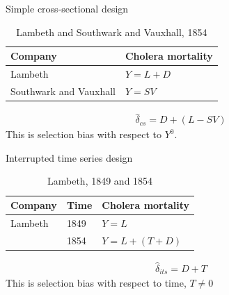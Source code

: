 \documentclass{beamer}
\begin{document}
\begin{frame}{Simple cross-sectional design}

\begin{table}\centering
		\caption{Lambeth and Southwark and Vauxhall, 1854}
		\begin{center}
		\begin{tabular}{ll}
		\toprule
		\multicolumn{1}{l}{\textbf{Company}}&
		\multicolumn{1}{c}{\textbf{Cholera mortality}}\\
		\midrule
		Lambeth  & $Y=L + D$ \\
		\midrule
		Southwark and Vauxhall  & $Y=SV$ \\
		\bottomrule
		\end{tabular}
		\end{center}
	\end{table}

\bigskip

\begin{eqnarray*}
\widehat{\delta}_{cs} = D + (L-SV)
\end{eqnarray*}This is selection bias with respect to $Y^0$.

\end{frame}

\begin{frame}{Interrupted time series design}

	\begin{table}\centering
		\caption{Lambeth, 1849 and 1854}
		\begin{center}
		\begin{tabular}{lll}
		\toprule
		\multicolumn{1}{l}{\textbf{Company}}&
		\multicolumn{1}{c}{\textbf{Time}}&
		\multicolumn{1}{c}{\textbf{Cholera mortality}}\\
		\midrule
		Lambeth & 1849 & $Y=L$ \\
		& 1854 & $Y=L + (T + D)$ \\
		\bottomrule
		\end{tabular}
		\end{center}
	\end{table}

\begin{eqnarray*}
\widehat{\delta}_{its} = D + T
\end{eqnarray*}This is selection bias with respect to time, $T \neq 0$


\end{frame}
\end{document}
